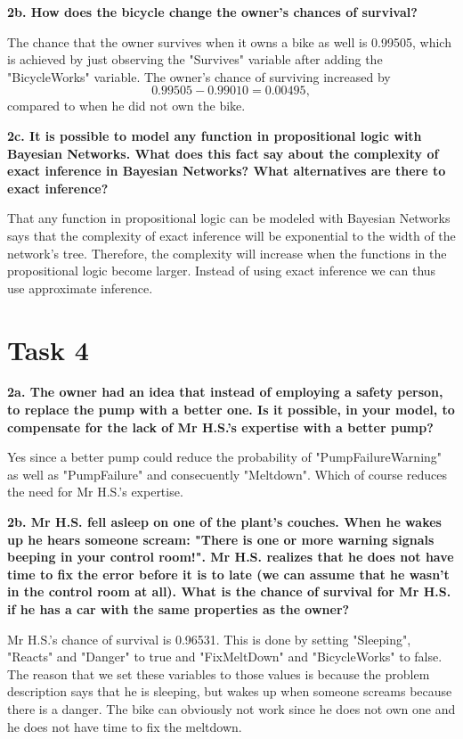 \documentclass[a4paper,10pt]{article}
\begin{document}
 \textbf{2b. How does the bicycle change the owner's chances of survival?}

 The chance that the owner survives when it owns a bike as well is 0.99505, which is achieved by just observing the "Survives" variable after adding the
 "BicycleWorks" variable.
 The owner's chance of surviving increased by 
 \begin{equation*}
	0.99505 - 0.99010 = 0.00495,
 \end{equation*} compared to when he did not own the bike.

 \textbf{2c. It is possible to model any function in propositional logic with Bayesian Networks. 
 What does this fact say about the complexity of exact inference in Bayesian Networks? 
 What alternatives are there to exact inference?}

 That any function in propositional logic can be modeled with Bayesian Networks says that the
 complexity of exact inference will be exponential to the width of the network's tree.
 Therefore, the complexity will increase when the functions in the propositional logic
 become larger. Instead of using exact inference we can thus use approximate inference.

 \section*{Task 4}

 \textbf{2a. The owner had an idea that instead of employing a safety person, to replace the pump with a better one. 
 Is it possible, in your model, to compensate for the lack of Mr H.S.'s expertise with a better pump?}

 Yes since a better pump could reduce the probability of "PumpFailureWarning" as 
 well as "PumpFailure" and consecuently "Meltdown".
 Which of course reduces the need for Mr H.S.'s expertise. 

 \textbf{2b. Mr H.S. fell asleep on one of the plant's couches. 
 When he wakes up he hears someone scream: "There is one or more warning signals beeping in your control room!". 
 Mr H.S. realizes that he does not have time to fix the error before it is to late (we can assume that he wasn't in the control room at all). 
 What is the chance of survival for Mr H.S. if he has a car with the same properties as the owner?}

 Mr H.S.'s chance of survival is 0.96531.
 This is done by setting "Sleeping", "Reacts" and "Danger" to true and "FixMeltDown" and "BicycleWorks" to false.
 The reason that we set these variables to those values is because the problem description says that he is sleeping, but wakes up when someone
 screams because there is a danger. The bike can obviously not work since he does not own one and he does not have time to fix the meltdown.
\end{document}
